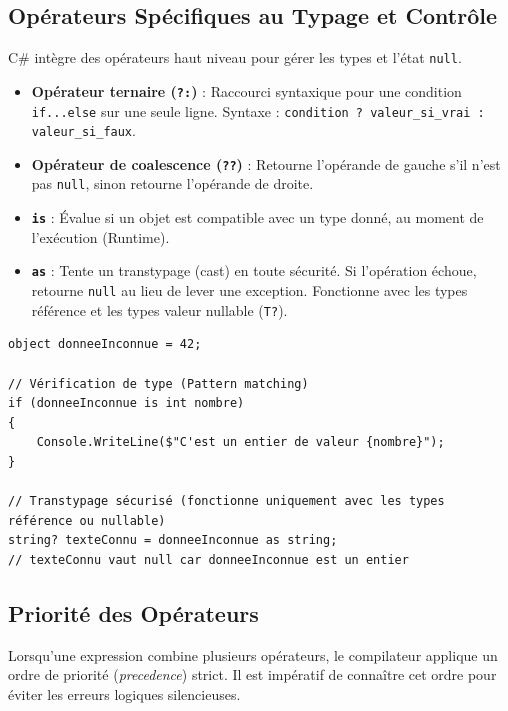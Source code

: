 \subsection{Opérateurs Spécifiques au Typage et Contrôle}

C\# intègre des opérateurs haut niveau pour gérer les types et l'état \texttt{null}.

\begin{itemize}
    \item \textbf{Opérateur ternaire (\texttt{?:})} : Raccourci syntaxique pour une condition \texttt{if...else} sur une seule ligne. Syntaxe : \texttt{condition ? valeur\_si\_vrai : valeur\_si\_faux}.
    \item \textbf{Opérateur de coalescence (\texttt{??})} : Retourne l'opérande de gauche s'il n'est pas \texttt{null}, sinon retourne l'opérande de droite.
    \item \textbf{\texttt{is}} : Évalue si un objet est compatible avec un type donné, au moment de l'exécution (Runtime).
    \item \textbf{\texttt{as}} : Tente un transtypage (cast) en toute sécurité. Si l'opération échoue, retourne \texttt{null} au lieu de lever une exception. Fonctionne avec les types référence et les types valeur nullable (\texttt{T?}).
\end{itemize}

\begin{lstlisting}[caption={Utilisation de l'opérateur is et as}]
object donneeInconnue = 42;

// Vérification de type (Pattern matching)
if (donneeInconnue is int nombre) 
{
    Console.WriteLine($"C'est un entier de valeur {nombre}");
}

// Transtypage sécurisé (fonctionne uniquement avec les types référence ou nullable)
string? texteConnu = donneeInconnue as string; 
// texteConnu vaut null car donneeInconnue est un entier
\end{lstlisting}

\subsection{Priorité des Opérateurs}

Lorsqu'une expression combine plusieurs opérateurs, le compilateur applique un ordre de priorité (\textit{precedence}) strict. Il est impératif de connaître cet ordre pour éviter les erreurs logiques silencieuses.


